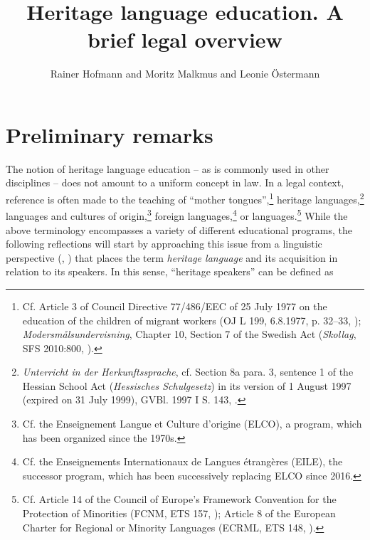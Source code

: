 \documentclass[output=paper,colorlinks,citecolor=brown]{langscibook}
\author{Rainer Hofmann\orcid{}\affiliation{} and Moritz Malkmus\orcid{}\affiliation{} and Leonie Östermann\orcid{}\affiliation{}}
\title{Heritage language education. A brief legal overview}
\begin{document}
\maketitle

\section{Preliminary remarks}\label{CH3.ss.1}

The notion of heritage language education -- as is commonly used in other disciplines \citep[3]{trifonas_aravossitas2018} -- does not amount to a uniform concept in law. In a legal context, reference is often made to the teaching of ``mother tongues'',\footnote{%
Cf. Article 3 of Council Directive 77/486/EEC of 25 July 1977 on the education of the children of migrant workers (OJ L 199, 6.8.1977, p. 32--33, \citealt{eec1977}); \textit{Modersmålsundervisning}, Chapter 10, Section 7 of the Swedish  Act (\textit{Skollag}, SFS 2010:800, \citealt{skollag2010}).} heritage languages,\footnote{%
\textit{Unterricht in der Herkunftssprache}, cf. Section 8a para. 3, sentence 1 of the Hessian School Act (\textit{Hessisches Schulgesetz}) in its version of 1 August 1997 (expired on 31 July 1999), GVBl. 1997 I S. 143, \citep{gvbl1997}.} languages and cultures of origin,\footnote{%
Cf. the  Enseignement Langue et Culture d’origine (ELCO), a program, which has been organized since the 1970s.} foreign languages,\footnote{%
Cf. the  Enseignements Internationaux de Langues étrangères (EILE), the successor program, which has been successively replacing ELCO since 2016.} or  languages.\footnote{%
Cf. Article 14 of the Council of Europe’s Framework Convention for the Protection of  Minorities (FCNM, ETS 157, \citealt{fcnm1995}); Article 8 of the European Charter for Regional or Minority Languages (ECRML, ETS 148, \citealt{ecrml2024}).}
While the above terminology encompasses a variety of different educational programs, the following reflections will start by approaching this issue from a linguistic perspective (\citealt[23]{mehlhorn2020}, \citealt[8]{polinsky2015}) that places the term \textit{heritage language} and its acquisition in relation to its speakers. In this sense, ``heritage speakers'' can be defined as 
\largerpage[2]
\end{document}
